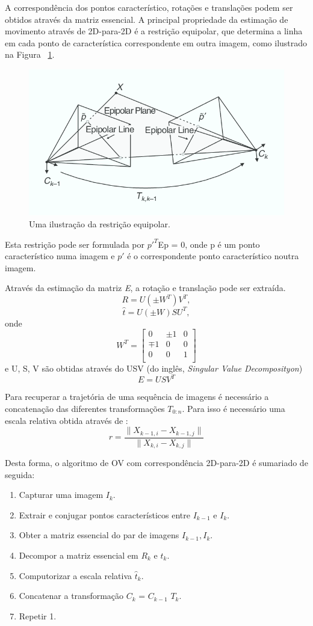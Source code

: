 A correspondência dos pontos característico, rotações e translações podem ser obtidos através da matriz essencial. A principal propriedade da estimação de movimento através de 2D-para-2D é a restrição equipolar, que determina a linha em cada ponto de característica correspondente em outra imagem, como ilustrado na Figura ~\ref{fig:epipolarconstrait}.

\begin{figure}[h!]
	\centering
	\includegraphics[width=0.7\linewidth]{figures/equipolarline}
	\caption{Uma ilustração da restrição equipolar. \cite{VOpart1}}
	\label{fig:epipolarconstrait}
\end{figure}

 Esta restrição pode ser formulada por $p'^{T}$Ep = 0, onde p é um ponto característico numa imagem e $p'$ é o correspondente ponto característico noutra imagem.
 
 Através da estimação da matriz \textit{E}, a rotação e translação pode ser extraída. 
 \[ R = U(\pm W^T)V^T ,\] \[ \hat{t} =  U(\pm W)SU^T, \] 
 onde \[  W^T = \left[\begin{array}{ccc}0&\pm1&0\\\mp1&0&0\\0&0&1\\\end{array}\right] \] 
 e U, S, V são obtidas através do USV (do inglês, \textit{Singular Value Decomposityon}) \[ E = USV^T \]
 
 Para recuperar a trajetória de uma sequência de imagens é necessário a concatenação das diferentes transformações \textit{$T_{0:n}$}. Para isso é necessário uma escala relativa obtida através de : \[ r = \frac{ \| X_{k-1,i} - X_{k-1,j} \| }{ \| X_{k,i} - X_{k,j} \| } \] 
 
Desta forma, o algoritmo de OV com correspondência 2D-para-2D é sumariado de seguida:
\begin{enumerate}
	\item Capturar uma imagem \textit{$I_{k}$}.
	\item Extrair e conjugar pontos característicos entre \textit{$I_{k-1}$} e \textit{$I_{k}$}.
	\item Obter a matriz essencial do par de imagens \textit{$I_{k-1},I_k$}.
	\item Decompor a matriz essencial em \textit{$R_k$} e \textit{$\hat{t}_k$}.
	\item Computorizar a escala relativa \textit{$\hat{t}_k$}.
	\item Concatenar a transformação $C_k$ = $C_{k-1}$ $T_k$.
	\item Repetir 1.
\end{enumerate}


